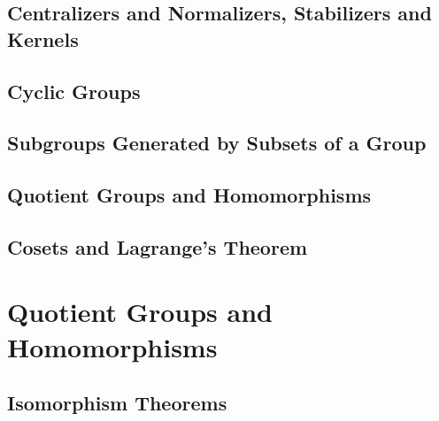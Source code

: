 \documentclass[a4paper, openany]{book}
\begin{document}
\section{Centralizers and Normalizers, Stabilizers and Kernels}

\newpage

\section{Cyclic Groups}

\newpage

\section{Subgroups Generated by Subsets of a Group}

\newpage

\section{Quotient Groups and Homomorphisms}

\newpage

\section{Cosets and Lagrange's Theorem}

\newpage

\chapter{Quotient Groups and Homomorphisms}
\section{Isomorphism Theorems}

\newpage
\end{document}
